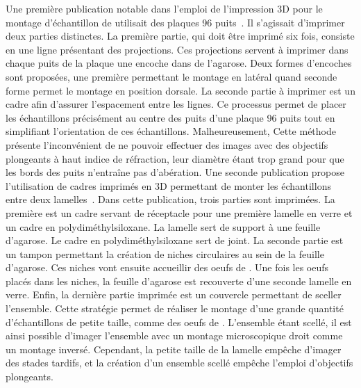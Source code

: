 \documentclass[\main/main.tex]{subfiles}
\begin{document}
%
Une première publication notable dans l'emploi de l'impression 3D pour le montage d'échantillon de \pz{} utilisait des plaques 96 puits~\cite{wittbrodt_2014}.
%
Il s'agissait d'imprimer deux parties distinctes.%
%
La première partie, qui doit être imprimé six fois, consiste en une ligne présentant des projections.
%
Ces projections servent à imprimer dans chaque puits de la plaque une encoche dans de l'agarose.
%
Deux formes d'encoches sont proposées, une première permettant le montage en latéral quand seconde forme permet le montage en position dorsale.
%
La seconde partie à imprimer est un cadre afin d'assurer l'espacement entre les lignes.
%
Ce processus permet de placer les échantillons précisément au centre des puits d'une plaque 96 puits tout en simplifiant l'orientation de ces échantillons.
%
Malheureusement, Cette méthode présente l'inconvénient de ne pouvoir effectuer des images avec des objectifs plongeants à haut indice de réfraction, leur diamètre étant trop grand pour que les bords des puits n'entraîne pas d'abération.
%
Une seconde publication propose l'utilisation de cadres imprimés en 3D permettant de monter les échantillons entre deux lamelles~\cite{alessandri_2017}.
%
Dans cette publication, trois parties sont imprimées.
%
La première est un cadre servant de réceptacle pour une première lamelle en verre et un cadre en polydiméthylsiloxane. La lamelle sert de support à une feuille d'agarose.
Le cadre en polydiméthylsiloxane sert de joint.
%
La seconde partie est un tampon permettant la création de niches circulaires au sein de la feuille d'agarose.
%
Ces niches vont ensuite accueillir des oeufs de \pz{}.
%
Une fois les oeufs placés dans les niches, la feuille d'agarose est recouverte d'une seconde lamelle en verre.
%
Enfin, la dernière partie imprimée est un couvercle permettant de sceller l'ensemble.
%
Cette stratégie permet de réaliser le montage d'une grande quantité d'échantillons de petite taille, comme des oeufs de \pz{}.
%
L'ensemble étant scellé, il est ainsi possible d'imager l'ensemble avec un montage microscopique droit comme un montage inversé.
%
Cependant, la petite taille de la lamelle empêche d'imager des stades tardifs, et la création d'un ensemble scellé empêche l'emploi d'objectifs plongeants.
\end{document}
